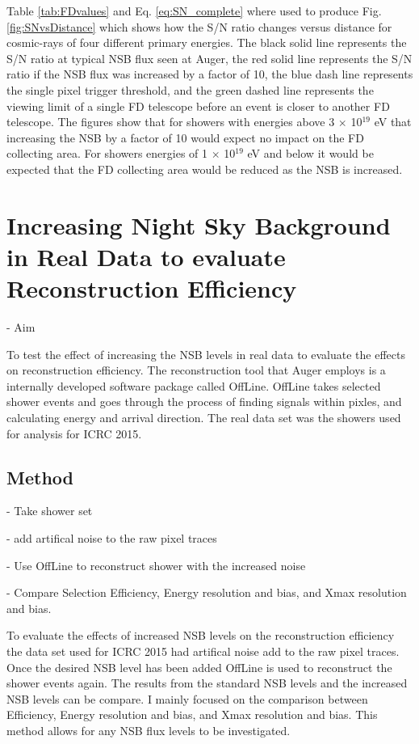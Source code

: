 Table \ref{tab:FDvalues} and Eq. \ref{eq:SN_complete} where used to produce Fig. \ref{fig:SNvsDistance} which shows how the S/N ratio changes versus distance for cosmic-rays of four different primary energies. The black solid line represents the S/N ratio at typical NSB flux seen at Auger, the red solid line represents the S/N ratio if the NSB flux was increased by a factor of 10, the blue dash line represents the single pixel trigger threshold, and the green dashed line represents the viewing limit of a single FD telescope before an event is closer to another FD telescope. The figures show that for showers with energies above 3 $\times$ 10$^{19}$ eV that increasing the NSB by a factor of 10 would expect no impact on the FD collecting area. For showers energies of 1 $\times$ 10$^{19}$ eV and below it would be expected that the FD collecting area would be reduced as the NSB is increased.



\section[Increasing NSB in Real Data to evaluate Reconstruction Efficiency]{Increasing Night Sky Background in Real Data to evaluate Reconstruction Efficiency}


- Aim

To test the effect of increasing the NSB levels in real data to evaluate the effects on reconstruction efficiency. The reconstruction tool that Auger employs is a internally developed software package called OffLine. OffLine takes selected shower events and goes through the process of finding signals within pixles, and calculating energy and arrival direction. The real data set was the showers used for analysis for ICRC 2015. 

\subsection{Method}

- Take shower set

- add artifical noise to the raw pixel traces

- Use OffLine to reconstruct shower with the increased noise

- Compare Selection Efficiency, Energy resolution and bias, and Xmax resolution and bias.

To evaluate the effects of increased NSB levels on the reconstruction efficiency the data set used for ICRC 2015 had artifical noise add to the raw pixel traces. Once the desired NSB level has been added OffLine is used to reconstruct the shower events again. The results from the standard NSB levels and the increased NSB levels can be compare. I mainly focused on the comparison between Efficiency, Energy resolution and bias, and Xmax resolution and bias. This method allows for any NSB flux levels to be investigated.


